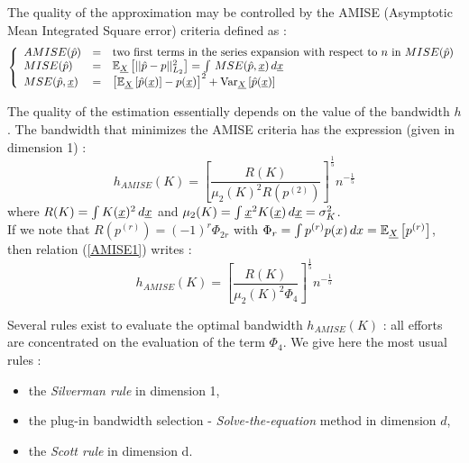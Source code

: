 {  The quality of the approximation may be controlled by the AMISE (Asymptotic Mean Integrated Square error) criteria defined as :
  \begin{align*}
    \left\{
    \begin{array}{lcl}
      AMISE(\hat{p}) & = & \mbox{two first terms in the series expansion with respect to $n$ in } MISE(\hat{p}) \\
      MISE(\hat{p}) & = & \mathbb{E}_{\underline{X}}\left[||\hat{p} - p||^2_{L_2}\right]   =  \int \, MSE(\hat{p}, {\underline{x}}) \, d{\underline{x}}  \\
      MSE(\hat{p}, {\underline{x}})&  =  & \left[ \mathbb{E}_{\underline{X}}\left[\hat{p}({\underline{x}})\right] - p({\underline{x}})\right]^2 + {\rm Var}_{\underline{X}}\left[\hat{p}({\underline{x}})\right]
    \end{array}
    \right.
  \end{align*}


  The quality of the estimation essentially depends on the value of the bandwidth $h$. The bandwidth that minimizes the AMISE criteria  has the expression (given in dimension 1) :
  \begin{equation}
    \label{AMISE1}
    h_{AMISE}(K) = \displaystyle \left[ \frac{R(K)}{\mu_2(K)^2R(p^{(2)})}\right]^{\frac{1}{5}}n^{-\frac{1}{5}}
  \end{equation}
  where  $R(K) = \int K({\underline{x}})^2\, d{\underline{x}}$ and $\mu_2(K) = \int {\underline{x}}^2K({\underline{x}})\, d{\underline{x}} = \sigma_K^2$.\\
  If we note that $R(p^{(r)}) = (-1)^r\Phi_{2r}$ with $\Phi_r = \int p^{(r)}p(x)\, dx = \mathbb{E}_{\underline{X}}\left[p^{(r)}\right]$, then relation (\ref{AMISE1}) writes :
  \begin{equation}
    \label{AMISE}
    h_{AMISE}(K) = \displaystyle \left[ \frac{R(K)}{\mu_2(K)^2\Phi_4}\right]^{\frac{1}{5}}n^{-\frac{1}{5}}
  \end{equation}

  Several rules exist to  evaluate the optimal bandwidth $ h_{AMISE}(K)$ : all efforts are concentrated on the evaluation of the term $\Phi_4$. We give here the most usual rules :
  \begin{itemize}
  \item the \emph{Silverman rule} in dimension 1,
  \item the plug-in bandwidth selection - \emph{Solve-the-equation} method in dimension $d$,
  \item the \emph{Scott rule} in dimension d.
  \end{itemize}



}
